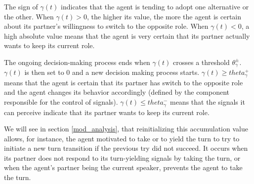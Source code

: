 The sign of $\gamma(t)$ indicates that the agent is tending to adopt one alternative or the other. 
When $\gamma(t)>0$, the higher its value, the more the agent is certain about its partner's willingness to switch to the opposite role.
When $\gamma(t)<0$, a high absolute value means that the agent is very certain that its partner actually wants to keep its current role. 

The ongoing decision-making process ends when $\gamma(t)$ crosses a threshold $\theta_{\gamma}^{\pm}$. $\gamma(t)$ is then set to 0 and a new decision making process starts.
$\gamma(t) \geq theta_{\gamma}^{+}$ means that the agent is certain that its partner has switch to the opposite role and the agent changes its behavior accordingly (defined by the component responsible for the control of signals). $\gamma(t) \leq theta_{\gamma}^{-}$ means that the signals it can perceive indicate that its partner wants to keep its current role. 


We will see in section \ref{mod_analysis}, that reinitializing this accumulation value allows, for instance, the agent motivated to take or to yield the turn to try to initiate a new turn transition if the previous try did not succeed. 
It occurs when its partner does not respond to its turn-yielding signals by taking the turn, or when the agent's partner being the current speaker, prevents the agent to take the turn.

